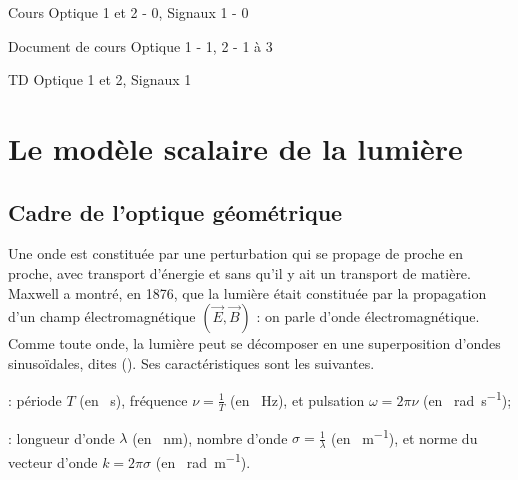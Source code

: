 \documentclass[12pt,fancy]{cours}
\begin{document}
{
\item Cours Optique 1 et 2 - 0, Signaux 1 - 0
\item Document de cours Optique 1 - 1, 2 - 1 à 3
\item TD Optique 1 et 2, Signaux 1
}


\section{Le modèle scalaire de la lumière}
\label{sec:modele}
\subsection{Cadre de l’optique géométrique}


Une onde est constituée par une perturbation qui se propage de proche en proche, avec transport d'énergie et sans qu'il y ait un transport de matière. Maxwell a montré, en 1876, que la lumière était constituée par la propagation d'un champ électromagnétique $(\vec{E}, \vec{B})$ : on parle d'onde électromagnétique. Comme toute onde, la lumière peut se décomposer en une superposition d'ondes sinusoïdales, dites  (). Ses caractéristiques sont les suivantes.
\begin{liste}
  \item {} :
  période $T$ (en \SI{}{s}), fréquence $\nu=\frac{1}{T}$ (en \SI{}{Hz}), et pulsation $\omega = 2\pi \nu$ (en \SI{}{rad.s^{-1}});

  \item {} :
  longueur d'onde $\lambda$ (en \SI{}{nm}), nombre d'onde $\sigma=\frac{1}{\lambda}$ (en \SI{}{m^{-1}}), et norme du vecteur d'onde $k=2\pi \sigma$ (en \SI{}{rad.m^{-1}}).

\end{liste}
\end{document}
